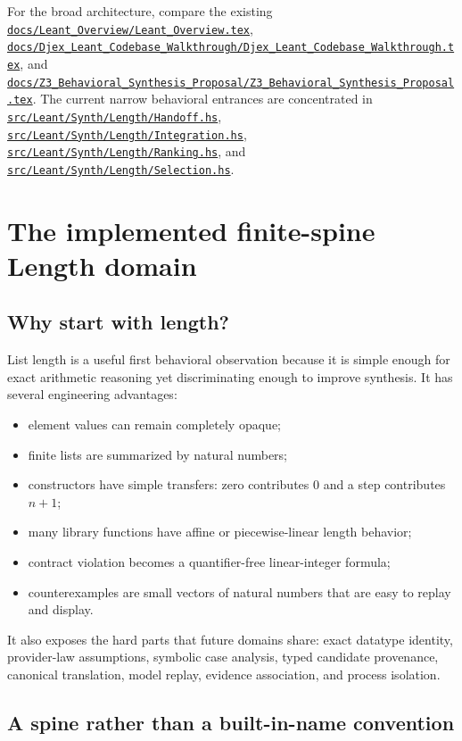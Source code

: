 \documentclass[10pt,letterpaper,oneside]{report}
\def\LeantCommit{494259dbd85ae2e6749246b08377f44b2f9936ac}
\def\LeantBase{https://github.com/VladimirReshetnikov/Leant/blob/\LeantCommit/}
\newcommand{\lpath}[1]{\href{\LeantBase#1}{\nolinkurl{#1}}}
\begin{document}
\begin{sourcebox}
For the broad architecture, compare the existing \lpath{docs/Leant_Overview/Leant_Overview.tex}, \lpath{docs/Djex_Leant_Codebase_Walkthrough/Djex_Leant_Codebase_Walkthrough.tex}, and \lpath{docs/Z3_Behavioral_Synthesis_Proposal/Z3_Behavioral_Synthesis_Proposal.tex}. The current narrow behavioral entrances are concentrated in \lpath{src/Leant/Synth/Length/Handoff.hs}, \lpath{src/Leant/Synth/Length/Integration.hs}, \lpath{src/Leant/Synth/Length/Ranking.hs}, and \lpath{src/Leant/Synth/Length/Selection.hs}.
\end{sourcebox}

\chapter{The implemented finite-spine Length domain}
\label{chap:length-domain}

\section{Why start with length?}

List length is a useful first behavioral observation because it is simple enough for exact arithmetic reasoning yet discriminating enough to improve synthesis. It has several engineering advantages:

\begin{itemize}
\item element values can remain completely opaque;
\item finite lists are summarized by natural numbers;
\item constructors have simple transfers: zero contributes $0$ and a step contributes $n+1$;
\item many library functions have affine or piecewise-linear length behavior;
\item contract violation becomes a quantifier-free linear-integer formula;
\item counterexamples are small vectors of natural numbers that are easy to replay and display.
\end{itemize}

It also exposes the hard parts that future domains share: exact datatype identity, provider-law assumptions, symbolic case analysis, typed candidate provenance, canonical translation, model replay, evidence association, and process isolation.

\section{A spine rather than a built-in-name convention}
\end{document}
